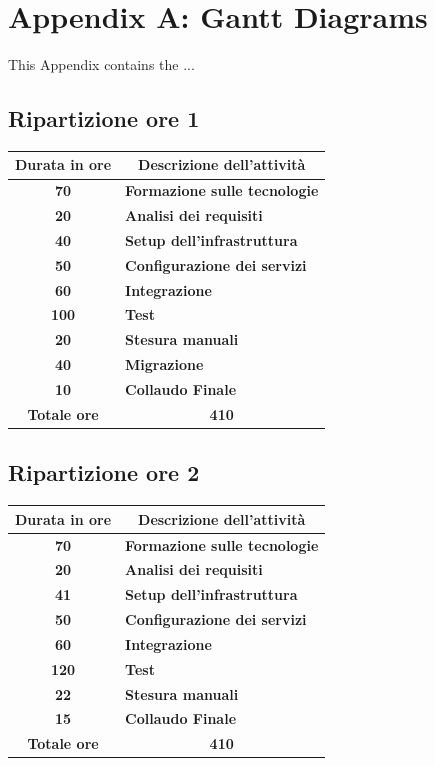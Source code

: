 \renewcommand\thechapter{A}
\chapter{Appendix A: Gantt Diagrams}
\label{AppendixA}

This Appendix contains the ...

\section{Ripartizione ore 1}

\begin{tabularx}{\textwidth}{c|X}
	\centering\textbf{Durata in ore} & \multicolumn{1}{c}{\textbf{Descrizione dell'attività}}\\\hline
	\textbf{70}&\textbf{Formazione sulle tecnologie}\\\hline
	\textbf{20}&\textbf{Analisi dei requisiti}\\\hline
	\textbf{40}&\textbf{Setup dell'infrastruttura}\\\hline
	\textbf{50}&\textbf{Configurazione dei servizi}\\\hline
	\textbf{60}&\textbf{Integrazione}\\\hline
	\textbf{100}&\textbf{Test}\\\hline
	\textbf{20}&\textbf{Stesura manuali}\\\hline
	\textbf{40}&\textbf{Migrazione}\\\hline
	\textbf{10}&\textbf{Collaudo Finale}\\\hline
	\textbf{Totale ore}&\multicolumn{1}{c}{\textbf{410}} \\	
\end{tabularx}


\section{Ripartizione ore 2}

\begin{tabularx}{\textwidth}{c|X}
	\centering\textbf{Durata in ore} & \multicolumn{1}{c}{\textbf{Descrizione dell'attività}}\\\hline
	\textbf{70}&\textbf{Formazione sulle tecnologie}\\\hline
	\textbf{20}&\textbf{Analisi dei requisiti}\\\hline
	\textbf{41}&\textbf{Setup dell'infrastruttura}\\\hline
	\textbf{50}&\textbf{Configurazione dei servizi}\\\hline
	\textbf{60}&\textbf{Integrazione}\\\hline
	\textbf{120}&\textbf{Test}\\\hline
	\textbf{22}&\textbf{Stesura manuali}\\\hline
	\textbf{15}&\textbf{Collaudo Finale}\\\hline
	\textbf{Totale ore}&\multicolumn{1}{c}{\textbf{410}} \\	
\end{tabularx}

